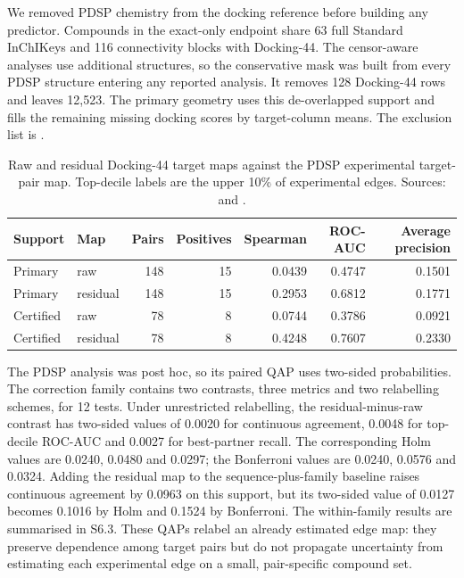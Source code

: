 We removed PDSP chemistry from the docking reference before building any predictor. Compounds in
the exact-only endpoint share 63 full Standard InChIKeys and 116 connectivity blocks with
Docking-44. The censor-aware analyses use additional structures, so the conservative mask was
built from every PDSP structure entering any reported analysis. It removes 128 Docking-44 rows
and leaves 12{,}523. The primary geometry uses this de-overlapped support and fills the remaining
missing docking scores by target-column means. The exclusion list is
.

\begin{table}[htbp]
\centering
\small
\setlength{\tabcolsep}{5pt}
\caption[Raw and residual target maps against the PDSP map]{Raw and residual Docking-44 target maps against the PDSP experimental target-pair map.
Top-decile labels are the upper 10\% of experimental edges. Sources:
 and
.}
\label{tab:s6-pdsp}
\begin{tabular}{llrrrrr}
\toprule
Support & Map & Pairs & Positives & Spearman & ROC-AUC & Average precision \\
\midrule
Primary   & raw      & 148 & 15 & 0.0439 & 0.4747 & 0.1501 \\
Primary   & residual & 148 & 15 & 0.2953 & 0.6812 & 0.1771 \\
Certified & raw      &  78 &  8 & 0.0744 & 0.3786 & 0.0921 \\
Certified & residual &  78 &  8 & 0.4248 & 0.7607 & 0.2330 \\
\bottomrule
\end{tabular}
\end{table}

The PDSP analysis was post hoc, so its paired QAP uses two-sided probabilities. The correction
family contains two contrasts, three metrics and two relabelling schemes, for 12 tests. Under
unrestricted relabelling, the residual-minus-raw contrast has two-sided values of 0.0020 for
continuous agreement, 0.0048 for top-decile ROC-AUC and 0.0027 for best-partner recall. The
corresponding Holm values are 0.0240, 0.0480 and 0.0297; the Bonferroni values are 0.0240, 0.0576
and 0.0324. Adding the residual map to the sequence-plus-family baseline raises continuous
agreement by 0.0963 on this support, but its two-sided value of 0.0127 becomes 0.1016 by Holm and
0.1524 by Bonferroni. The within-family results are summarised in S6.3. These QAPs relabel an
already estimated edge map: they preserve dependence among target pairs but do not propagate
uncertainty from estimating each experimental edge on a small, pair-specific compound set.


